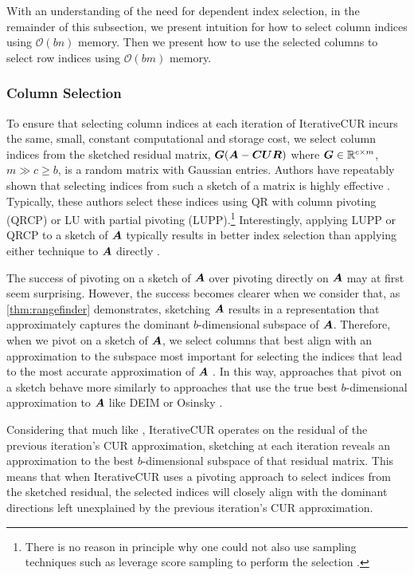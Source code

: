 With an understanding of the need for dependent index selection, in the remainder of this subsection, we present intuition for how to select column indices using $\mathcal{O}(bn)$ memory. Then we present how to use the selected columns to select row indices using $\mathcal{O}(bm)$ memory.


\subsubsection{Column Selection}
To ensure that selecting column indices at each iteration of IterativeCUR incurs the same, small, constant computational and storage cost, we select column indices from the sketched residual matrix, $\boldsymbol{G}(\boldsymbol{A}- \boldsymbol{C}\boldsymbol{U}\boldsymbol{R})$ where $\boldsymbol{G} \in \mathbb{R}^{c \times m}$, $m \gg c \geq b$, is a random matrix with Gaussian entries. Authors have repeatably shown that selecting indices from such a sketch of a matrix is highly effective \cite{chen2020efficient, duersch2020randomized, dong2023simpler,  martinsson2017householder, melgaard2015gaussian, pearce2025adaptive}. Typically, these authors select these indices using QR with column pivoting (QRCP) or LU with partial pivoting (LUPP).\footnote{There is no reason in principle why one could not also use sampling techniques such as leverage score sampling to perform the selection \cite{mahoney2009cur}.} Interestingly, applying LUPP or QRCP to a sketch of $\boldsymbol{A}$ typically results in better index selection than applying either technique to $\boldsymbol{A}$ directly \cite{dong2024robust, duersch2020randomized}. 

The success of pivoting on a sketch of $\boldsymbol{A}$ over pivoting directly on $\boldsymbol{A}$ may at first seem surprising. However, the success becomes clearer when we consider that, as \cref{thm:rangefinder} demonstrates, sketching $\boldsymbol{A}$ results in a representation that approximately captures the dominant $b$-dimensional subspace of $\boldsymbol{A}$. Therefore, when we pivot on a sketch of $\boldsymbol{A}$, we select columns that best align with an approximation to the subspace most important for selecting the indices that lead to the most accurate approximation of $\boldsymbol{A}$ \cite{cortinovis2024adaptive, osinsky2025close}. In this way, approaches that pivot on a sketch behave more similarly to approaches that use the true best $b$-dimensional approximation to $\boldsymbol{A}$ like DEIM \cite{chaturantabut2010nonlinear,sorensen2016deim} or Osinsky \cite{osinsky2025close}.

Considering that much like \cite{pearce2025adaptive}, IterativeCUR operates on the residual of the previous iteration's CUR approximation, sketching at each iteration reveals an approximation to the best $b$-dimensional subspace of that residual matrix.  This means that when IterativeCUR uses a pivoting approach to select indices from the sketched residual, the selected indices will closely align with the dominant directions left unexplained by the previous iteration's CUR approximation.

